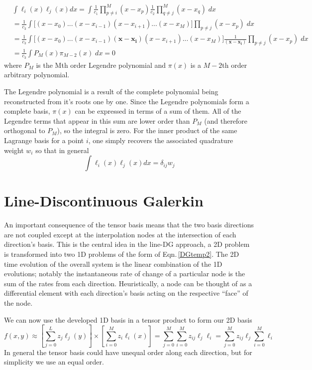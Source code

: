 \documentclass[letterpaper,12pt]{report}
\newcommand{\be}{\begin{equation}}
\newcommand{\ee}{\end{equation}}
\begin{document}
\be \begin{split} &\int \ell_i(x) \ell_j(x) dx = \int \frac{1}{c_1} \prod_{p\neq i}^M (x-x_p) \frac{1}{c_2}\prod_{q \neq j}^M (x-x_q) \;dx \\ 
&=\frac{1}{c_3} \int  \Big[(x-x_0)...(x-x_{i-1})(x-x_{i+1})...(x-x_M)\Big]\prod_{p \neq j} (x-x_p) \;dx\\
&=\frac{1}{c_3} \int  \Big[(x-x_0)...(x-x_{i-1}) \boldsymbol{(x-x_i)}(x-x_{i+1})...(x-x_M)\Big] \frac{1}{\boldsymbol{(x-x_i)}}\prod_{p \neq j} (x-x_p) \;dx\\
&=\frac{1}{c_3} \int  P_M(x) \pi_{M-2}(x) \;dx= 0\end{split}\ee
where $P_M$ is the Mth order Legendre polynomial and $\pi(x)$ is a $M-2$th order arbitrary polynomial.

The Legendre polynomial is a result of the complete polynomial being reconstructed from it's roots one by one. Since the Legendre polynomials form a complete basis, $\pi(x)$ can be expressed in terms of a sum of them. All of the Legendre terms that appear in this sum are lower order than $P_M$ (and therefore orthogonal to $P_M$), so the integral is zero. For the inner product of the same Lagrange basis for a point $i$, one simply recovers the associated quadrature weight $w_i$ so that in general
\be \int \ell_i(x) \ell_j(x) dx = \delta_{ij} w_j \ee

%
\section{Line-Discontinuous Galerkin}
An important consequence of the tensor basis means that the two basis directions are not coupled except at the interpolation nodes at the intersection of each direction's basis. This is the central idea in the line-DG \cite{Persson2013} approach, a 2D problem is transformed into two 1D problems of the form of Eqn.\,\eqref{DGtemp2}. The 2D time evolution of the overall system is the linear combination of the 1D evolutions; notably the instantaneous rate of change of a particular node is the sum of the rates from each direction. Heuristically, a node can be thought of as a differential element with each direction's basis acting on the respective ``face'' of the node.

We can now use the developed 1D basis in a tensor product to form our 2D basis
\be f(x,y) \approx \left[\sum_{j=0}^L z_j \ell_j(y) \right] \times \left[ \sum_{i=0}^M z_i \ell_i(x) \right] = \sum_{j=0}^M \sum_{i=0}^M z_{ij} \ell_j \ell_i =  \sum_{j=0}^M z_{ij} \ell_j \sum_{i=0}^M  \ell_i \ee
In general the tensor basis could have unequal order along each direction, but for simplicity we use an equal order.
\end{document}
